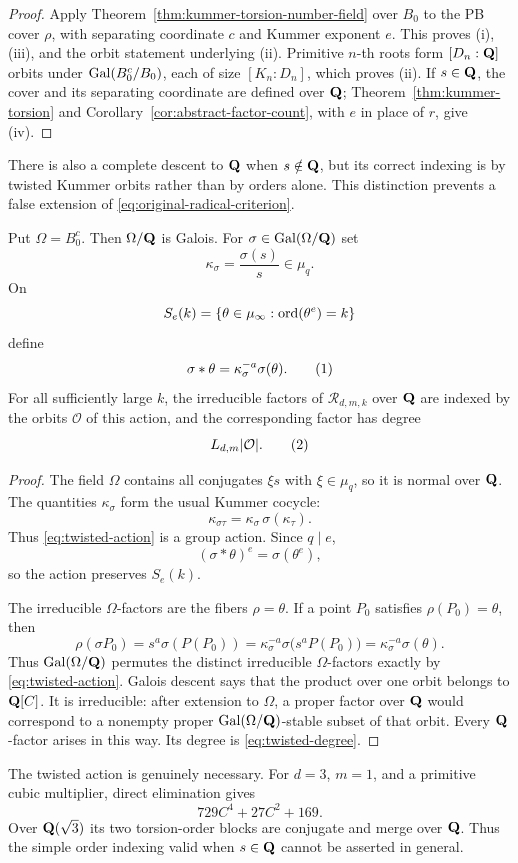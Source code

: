 \begin{proof}
Apply Theorem~\ref{thm:kummer-torsion-number-field} over $B_0$ to the
PB cover $\rho$, with separating coordinate $c$ and Kummer exponent
$e$.
This proves (i), (iii), and the orbit statement underlying (ii).
Primitive $n$-th roots form $[D_n:\mathbf Q]$ orbits under
$\operatorname{Gal}(B_0^c/B_0)$, each of size $[K_n:D_n]$, which proves (ii).  If
$s\in\mathbf Q$, the cover and its separating coordinate are defined over
$\mathbf Q$; Theorem~\ref{thm:kummer-torsion} and
Corollary~\ref{cor:abstract-factor-count}, with $e$ in place of $r$,
give (iv).
\end{proof}

There is also a complete descent to $\mathbf Q$ when $s\notin\mathbf Q$, but its
correct indexing is by twisted Kummer orbits rather than by orders
alone.  This distinction prevents a false extension of
\eqref{eq:original-radical-criterion}.

\begin{proposition}
\label{prop:twisted-orbit-descent}
Put $\Omega=B_0^c$.  Then $\Omega/\mathbf Q$ is Galois.  For
$\sigma\in\operatorname{Gal}(\Omega/\mathbf Q)$ set
\[
 \kappa_\sigma=\frac{\sigma(s)}s\in\mu_q.
\]
On
\[
 S_e(k)=\{\theta\in\mu_\infty:\operatorname{ord}(\theta^e)=k\}
\]
define
\[
 \sigma*\theta
 =\kappa_\sigma^{-a}\sigma(\theta).
 \numberthis\label{eq:twisted-action}
\]
For all sufficiently large $k$, the irreducible factors of
$\mathcal R_{d,m,k}$ over $\mathbf Q$ are indexed by the orbits
$\mathcal O$ of this action, and the corresponding factor has degree
\[
 L_{d,m}|\mathcal O|.
 \numberthis\label{eq:twisted-degree}
\]
\end{proposition}

\begin{proof}
The field $\Omega$ contains all conjugates $\xi s$ with
$\xi\in\mu_q$, so it is normal over $\mathbf Q$.  The quantities
$\kappa_\sigma$ form the usual Kummer cocycle:
\[
 \kappa_{\sigma\tau}
 =\kappa_\sigma\,\sigma(\kappa_\tau).
\]
Thus \eqref{eq:twisted-action} is a group action.  Since $q\mid e$,
\[
 (\sigma*\theta)^e=\sigma(\theta^e),
\]
so the action preserves $S_e(k)$.

The irreducible $\Omega$-factors are the fibers $\rho=\theta$.  If a
point $P_0$ satisfies $\rho(P_0)=\theta$, then
\[
 \rho(\sigma P_0)
 =s^a\sigma(P(P_0))
 =\kappa_\sigma^{-a}\sigma\bigl(s^aP(P_0)\bigr)
 =\kappa_\sigma^{-a}\sigma(\theta).
\]
Thus
$\operatorname{Gal}(\Omega/\mathbf Q)$ permutes the distinct irreducible $\Omega$-factors
exactly by \eqref{eq:twisted-action}.  Galois descent says that the
product over one orbit belongs to $\mathbf Q[C]$.  It is irreducible: after
extension to $\Omega$, a proper factor over $\mathbf Q$ would correspond to a
nonempty proper $\operatorname{Gal}(\Omega/\mathbf Q)$-stable subset of that orbit.  Every
$\mathbf Q$-factor arises in this way.  Its degree is
\eqref{eq:twisted-degree}.
\end{proof}

\begin{remark}
The twisted action is genuinely necessary.  For $d=3$, $m=1$, and a
primitive cubic multiplier, direct elimination gives
\[
 729C^4+27C^2+169.
\]
Over $\mathbf Q(\sqrt3)$ its two torsion-order blocks are conjugate and merge
over $\mathbf Q$.  Thus the simple order indexing valid when $s\in\mathbf Q$ cannot
be asserted in general.
\end{remark}
